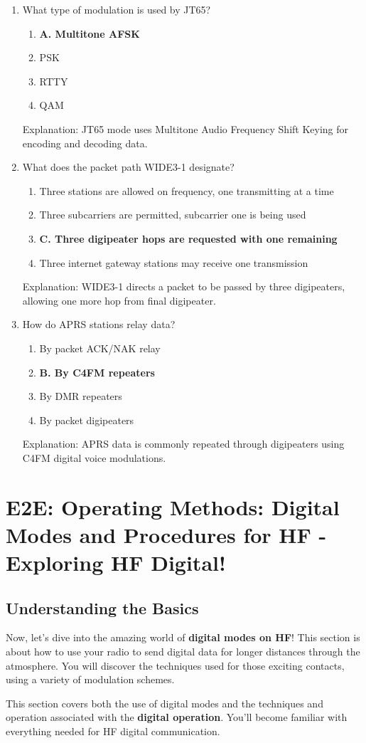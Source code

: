 \begin{enumerate}
     \item What type of modulation is used by JT65?
      \begin{enumerate}
        \item \textbf{A. Multitone AFSK}
         \item  PSK
       \item  RTTY
       \item  QAM
       \end{enumerate}
     \textcolor{myred}{Explanation:}
         JT65 mode uses Multitone Audio Frequency Shift Keying for encoding and decoding data.
        
     \item What does the packet path WIDE3-1 designate?
      \begin{enumerate}
      \item  Three stations are allowed on frequency, one transmitting at a time
      \item  Three subcarriers are permitted, subcarrier one is being used
       \item \textbf{C. Three digipeater hops are requested with one remaining}
        \item  Three internet gateway stations may receive one transmission
      \end{enumerate}
     \textcolor{myred}{Explanation:}
       WIDE3-1 directs a packet to be passed by three digipeaters, allowing one more hop from final digipeater.
     
    \item How do APRS stations relay data?
      \begin{enumerate}
      \item  By packet ACK/NAK relay
        \item \textbf{B. By C4FM repeaters}
       \item  By DMR repeaters
       \item  By packet digipeaters
      \end{enumerate}
    \textcolor{myred}{Explanation:}
      APRS data is commonly repeated through digipeaters using C4FM digital voice modulations.
\end{enumerate}

\section{E2E: Operating Methods: Digital Modes and Procedures for HF - Exploring HF Digital!}
\subsection*{Understanding the Basics}
Now, let's dive into the amazing world of \textcolor{myblue}{\textbf{digital modes on HF}}! This section is about how to use your radio to send digital data for longer distances through the atmosphere. You will discover the techniques used for those exciting contacts, using a variety of modulation schemes.
\par
    This section covers both the use of digital modes and the techniques and operation associated with the \textcolor{myblue}{\textbf{digital operation}}. You'll become familiar with everything needed for HF digital communication.

